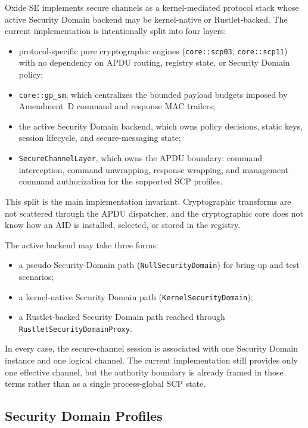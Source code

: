 Oxide SE implements secure channels as a kernel-mediated protocol stack whose
active Security Domain backend may be kernel-native or Rustlet-backed. The
current implementation is intentionally split into four layers:

\begin{itemize}
\item protocol-specific pure cryptographic engines
      (\texttt{core::scp03}, \texttt{core::scp11}) with no dependency on APDU
      routing, registry state, or Security Domain policy;
\item \texttt{core::gp\_sm}, which centralizes the bounded payload budgets
      imposed by Amendment~D command and response MAC trailers;
\item the active Security Domain backend, which owns policy decisions, static
      keys, session lifecycle, and secure-messaging state;
\item \texttt{SecureChannelLayer}, which owns the APDU boundary: command
      interception, command unwrapping, response wrapping, and management
      command authorization for the supported SCP profiles.
\end{itemize}

This split is the main implementation invariant. Cryptographic transforms are
not scattered through the APDU dispatcher, and the cryptographic core does not
know how an AID is installed, selected, or stored in the registry.

The active backend may take three forms:
\begin{itemize}
\item a pseudo-Security-Domain path (\texttt{NullSecurityDomain}) for bring-up
      and test scenarios;
\item a kernel-native Security Domain path (\texttt{KernelSecurityDomain});
\item a Rustlet-backed Security Domain path reached through
      \texttt{RustletSecurityDomainProxy}.
\end{itemize}

In every case, the secure-channel session is associated with one Security
Domain instance and one logical channel. The current implementation still
provides only one effective channel, but the authority boundary is already
framed in those terms rather than as a single process-global SCP state.

\subsection{Security Domain Profiles}
\label{sec:impl-sd-profiles}
\label{sec:impl-scp-profiles}

